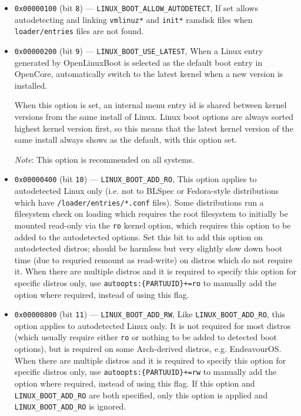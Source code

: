 \documentclass[]{article}
\begin{document}
\begin{itemize}
\begin{itemize}
	  \item \texttt{0x00000100} (bit \texttt{8}) --- \texttt{LINUX\_BOOT\_ALLOW\_AUTODETECT},
	  If set allows autodetecting and linking \texttt{vmlinuz*} and \texttt{init*} ramdisk files
	  when \texttt{loader/entries} files are not found.
	  \item \texttt{0x00000200} (bit \texttt{9}) --- \texttt{LINUX\_BOOT\_USE\_LATEST},
	  When a Linux entry generated by OpenLinuxBoot is selected as the default boot entry
    in OpenCore, automatically switch to the latest kernel when a new version is installed. \medskip

	  When this option is set, an internal menu entry id is shared between kernel versions from the same install
    of Linux. Linux boot options are always sorted highest kernel version first, so this means that
    the latest kernel version of the same install always shows as the default, with this option set. \medskip

	  \emph{Note}: This option is recommended on all systems. \medskip

	  \item \texttt{0x00000400} (bit \texttt{10}) --- \texttt{LINUX\_BOOT\_ADD\_RO},
	  This option applies to autodetected Linux only (i.e. not to BLSpec or
    Fedora-style distributions which have \texttt{/loader/entries/*.conf} files).
    Some distributions run a filesystem check on loading which requires the root
    filesystem to initially be mounted read-only via the \texttt{ro} kernel option, which requires this
    option to be added to the autodetected options. Set this bit to add this
    option on autodetected distros; should be harmless but very slightly slow down boot time (due to requried
    remount as read-write) on distros which do not require it.
    When there are multiple distros and it is required to specify this option for specific distros only, use
    \texttt{autoopts:\{PARTUUID\}+=ro} to manually add the option where required, instead of using this flag.

	  \item \texttt{0x00000800} (bit \texttt{11}) --- \texttt{LINUX\_BOOT\_ADD\_RW},
	  Like \texttt{LINUX\_BOOT\_ADD\_RO}, this option applies to autodetected Linux only. It is not
    required for most distros (which usually require either \texttt{ro} or nothing to be added to
    detected boot options), but is required on some Arch-derived distros, e.g. EndeavourOS.
    When there are multiple distros and it is required to specify this option for specific distros only, use
    \texttt{autoopts:\{PARTUUID\}+=rw} to manually add the option where required, instead of using this flag.
    If this option and \texttt{LINUX\_BOOT\_ADD\_RO} are both specified, only this option is applied
    and \texttt{LINUX\_BOOT\_ADD\_RO} is ignored.


\end{itemize}
\end{itemize}
\end{document}
